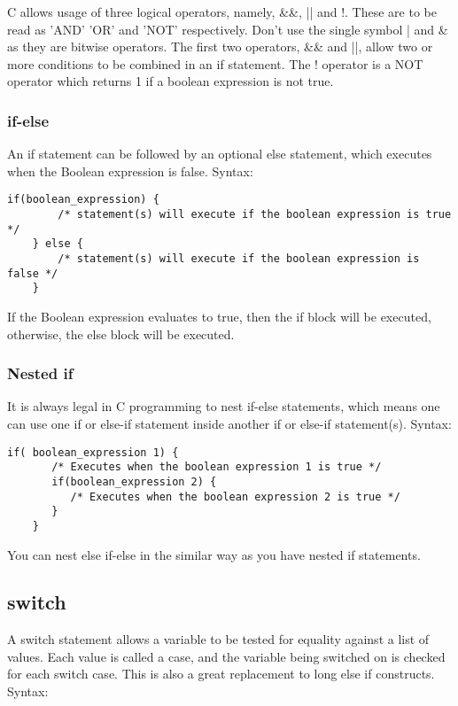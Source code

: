 C allows usage of three logical operators, namely, \&\&, || and !. These are to be read as 'AND' 'OR' and 'NOT' respectively. Don't use the single symbol | and \& as they are bitwise operators. The first two operators, \&\& and ||, allow two or more conditions to be combined in an if statement. The ! operator is a NOT operator which returns 1 if a boolean expression is not true.


\subsubsection{if-else}
An if statement can be followed by an optional else statement, which executes when the Boolean expression is false. Syntax:

\begin{lstlisting}[style=CStyle]
    if(boolean_expression) {
        /* statement(s) will execute if the boolean expression is true */
    } else {
        /* statement(s) will execute if the boolean expression is false */
    }
\end{lstlisting}

If the Boolean expression evaluates to true, then the if block will be executed, otherwise, the else block will be executed.

\subsubsection{Nested if}

It is always legal in C programming to nest if-else statements, which means one can use one if or else-if statement inside another if or else-if statement(s). Syntax:

\begin{lstlisting}[style=CStyle]
    if( boolean_expression 1) {    
       /* Executes when the boolean expression 1 is true */
       if(boolean_expression 2) {
          /* Executes when the boolean expression 2 is true */
       }
    }
\end{lstlisting}

You can nest else if-else in the similar way as you have nested if statements.


\subsection{switch}
A switch statement allows a variable to be tested for equality against a list of values. Each value is called a case, and the variable being switched on is checked for each switch case. This is also a great replacement to long else if constructs. Syntax:

